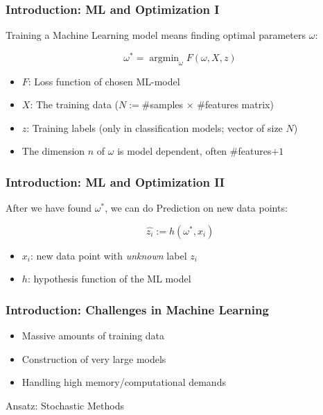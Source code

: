 \documentclass[10pt]{beamer}
\DeclareMathOperator{\argmin}{argmin}
\begin{document}
  \begin{frame}\frametitle{Introduction: ML and Optimization I}
    \alert{Training} a Machine Learning model means finding optimal parameters $\omega$:

    $$ \omega^* = \argmin_{\omega} F(\omega, X, z)$$
    
    \begin{itemize}
      \item \alert{$F$}: Loss function of chosen ML-model
      \item \alert{$X$}: The training data ($N:=\#$samples $\times$ $\#$features matrix)
      \item \alert{$z$}: Training labels (only in classification models; vector of size $N$)
      
      \item The dimension $n$ of $\omega$ is model dependent, often $\#$features$+1$
    \end{itemize}   
  \end{frame}

  \begin{frame}\frametitle{Introduction: ML and Optimization II}
    After we have found $\omega^*$, we can do \alert{Prediction} on new data points:

    $$ \hat {z_i} := h(\omega^*, x_i)$$
    
    \begin{itemize}
      \item \alert{$x_i$}: new data point with \emph{unknown} label \alert{$z_i$}
      \item \alert{$h$}: hypothesis function of the ML model
    \end{itemize}   
  \end{frame}

  \begin{frame}
    \frametitle{Introduction: Challenges in Machine Learning}
      \begin{itemize}
        \item Massive amounts of training data 
        \item Construction of very large models
        \item Handling high memory/computational demands
      \end{itemize}
      \vspace{36pt}
      
    \centering \large{Ansatz: \alert{Stochastic Methods}}
  \end{frame}
  
\end{document}
